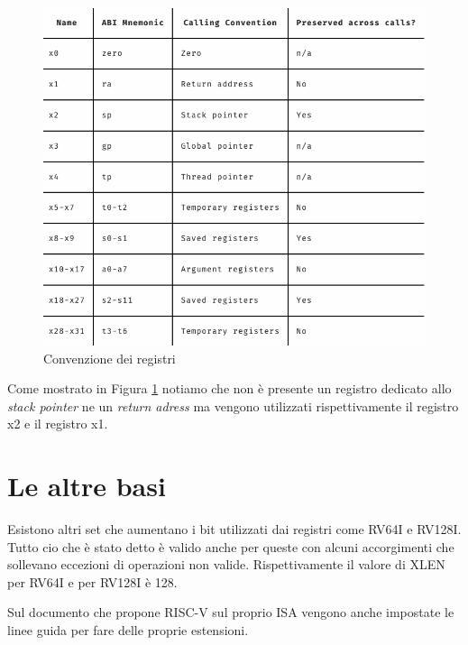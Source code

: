 \documentclass[12pt,a4paper]{report}
\begin{document}
\begin{figure}[h!]
\centering
	\includegraphics[scale=0.3]{ABI-RISC-V}
	\caption{Convenzione dei registri}
	\label{Fig:ConvenzioneRegistri}
\end{figure}

Come mostrato in Figura \ref{Fig:ConvenzioneRegistri} notiamo che non è presente un registro dedicato allo \textit{stack pointer} ne un \textit{return adress} ma vengono utilizzati rispettivamente il registro x2 e il registro x1.


\section{Le altre basi}
Esistono altri set che aumentano i bit utilizzati dai registri come RV64I e RV128I. Tutto cio che è stato detto è valido anche per queste con alcuni accorgimenti che sollevano eccezioni di operazioni non valide.
Rispettivamente il valore di XLEN per RV64I e per RV128I è 128.


Sul documento che propone RISC-V sul proprio ISA vengono anche impostate le linee guida per fare delle proprie estensioni.





\end{document}
